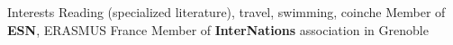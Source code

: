 \begin{rubric}{Interests}
\entry*[Hobbies] 
Reading (specialized literature), travel, swimming, coinche %
\entry*[Activities] 
Member of \textbf{ESN}, ERASMUS France
\entry*[]
Member of \textbf{InterNations} association in Grenoble
\end{rubric}

